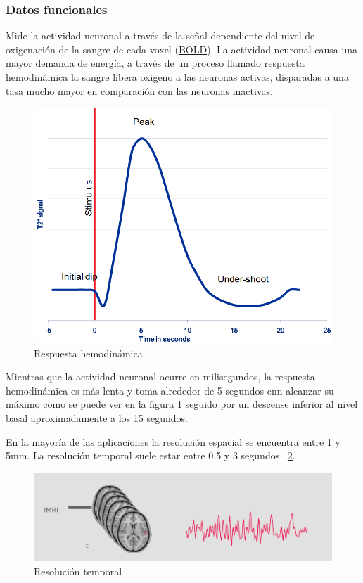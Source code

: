 \subsubsection{Datos funcionales}

Mide la actividad neuronal a través de la señal dependiente del nivel de oxigenación de la sangre de cada voxel (\hyperref[glos:bold]{BOLD}). La actividad neuronal causa una mayor demanda de energía, a través de un proceso llamado respuesta hemodinámica la sangre libera oxigeno a las neuronas activas, disparadas a una tasa mucho mayor en comparación con las neuronas inactivas. \cite{brainhack,bold_fmri}

\begin{figure}[H]
  \centering
    \includegraphics[scale=0.5]{img/bold.png}
  \caption{Respuesta hemodinámica}
  \label{eda:bold}
\end{figure}

Mientras que la actividad neuronal ocurre en milisegundos, la respuesta hemodinámica es más lenta y toma alrededor de 5 segundos enn alcanzar su máximo como se puede ver en la figura \ref{eda:bold} seguido por un descense inferior al nivel basal aproximadamente a los 15 segundos.

En la mayoría de las aplicaciones la resolución espacial se encuentra entre 1 y 5mm. La resolución temporal suele estar entre 0.5 y 3 segundos ~\ref{eda:resol}.\cite{courserafmri1,brainhack,fmri_oxford}

\begin{figure}[H]
  \centering
    \includegraphics[scale=0.5]{img/resol.png}
  \caption{Resolución temporal}
  \label{eda:resol}
\end{figure}

